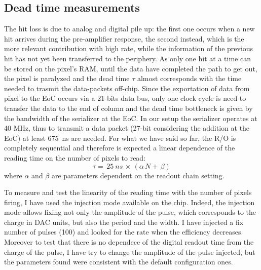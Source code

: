     \subsection{Dead time measurements}
        The hit loss is due to analog and digital pile up: the first one occurs when a new hit arrives during the pre-amplifier response, the second instead, which is the more relevant contribution with high rate, while the information of the previous hit has not yet been transferred to the periphery.  
        As only one hit at a time can be stored on the pixel's RAM, until the data have completed the path to get out, the pixel is paralyzed and the dead time $\tau$ almost corresponds with the time needed to trasmit the data-packets off-chip.
        Since the exportation of data from pixel to the EoC occurs via a 21-bits data bus, only one clock cycle is need to transfer the data to the end of column and the dead time bottleneck is given by the bandwidth of the serializer at the EoC. In our setup the serializer operates at 40 MHz, thus to transmit a data packet (27-bit considering the addition at the EoC) at least \SI{675}{ns} are needed. 
        For what we have said so far, the R/O is completely sequential and therefore is expected a linear dependence of the reading time on the number of pixels to read:
        \begin{equation}
            \tau =\, 25\: \unit{ns}\, \times\, (\alpha\, N +\, \beta)
            \label{eq:reading_time}
        \end{equation}
        where $\alpha$ and $\beta$ are parameters dependent on the readout chain setting. 
        
        To measure and test the linearity of the reading time with the number of pixels firing, I have used the injection mode available on the chip. 
        Indeed, the injection mode allows fixing not only the amplitude of the pulse, which corresponds to the charge in DAC units, but also the period and the width.
        I have injected a fix number of pulses (100) and looked for the rate when the efficiency decreases. 
        Moreover to test that there is no dependece of the digital readout time from the charge of the pulse, I have try to change the amplitude of the pulse injected, but the parameters found were consistent with the default configuration ones.

